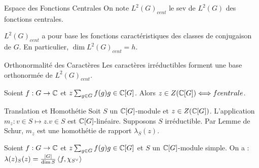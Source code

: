 \documentclass{cours}
\begin{document}
\begin{définition}{Espace des Fonctions Centrales}{}
    On note $L^{2}(G)_{cent}$ le sev de $L^{2}(G)$ des fonctions centrales.
\end{définition}

\begin{lemma}
    $L^{2}(G)_{cent}$ a pour base les fonctions caractéristiques des classes de conjugaison de $G$. En particulier, $\dim L^{2}(G)_{cent} = h$.
\end{lemma}

\begin{théorème}{Orthonormalité des Caractères}{}
    Les caractères irréductibles forment une base orthonormée de $L^{2}(G)_{cent}$.
\end{théorème}

\begin{lemma}
    Soient $f : G \rightarrow \mathbb{C}$ et $z \sum_{g \in G}f(g)g \in \mathbb{C}[G]$. Alors $z \in Z(\mathbb{C}[G]) \Longleftrightarrow f centrale$.
\end{lemma}

\begin{définition}{Translation et Homothétie}{}
    Soit $S$ un $\mathbb{C}[G]$-module et $z \in Z(\mathbb{C}[G])$. L'application $m_{z} : v \in S \mapsto z.v \in S$ est $\mathbb{C}[G]$-linéaire. Supposons $S$ irréductible. Par Lemme de Schur, $m_{z}$ est une homothétie de rapport $\lambda_{S}(z)$.
\end{définition}

\begin{lemma}
    Soient $f : G \rightarrow \mathbb{C}$ et $z \sum_{g \in G}f(g)g \in \mathbb{C}[G]$ et $S$ un $\mathbb{C}[G]$-module simple. On a : $\lambda(z)_{S}(z) = \frac{\left|G\right|}{\dim S}\left\langle f, \chi_{S^{\lor}} \right\rangle$
\end{lemma}
\end{document}
